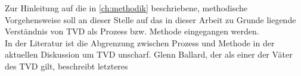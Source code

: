 %
%
%
%
%
%

Zur Hinleitung auf die in \cref{ch:methodik} beschriebene, methodische Vorgehensweise soll an dieser Stelle auf das in dieser Arbeit zu Grunde liegende Verständnis von \ac{TVD} als Prozess bzw. Methode eingegangen werden.\\
In der Literatur ist die Abgrenzung zwischen Prozess und Methode in der aktuellen Diskussion um TVD unscharf. Glenn Ballard, der als einer der Väter des TVD gilt, beschreibt letzteres